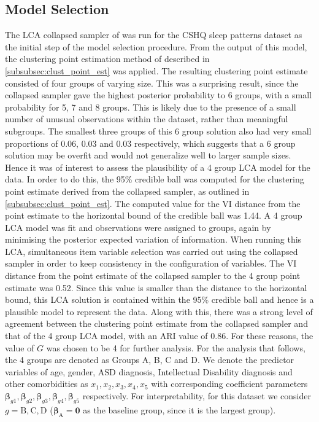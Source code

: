 \documentclass[11pt]{article}
\def\bsbet{\boldsymbol{\beta}}
\theoremstyle{plain}
\theoremstyle{definition}
\begin{document}
\subsection{Model Selection}
The LCA collapsed sampler of \citet{white_bayesian_2016} was run for the CSHQ sleep patterns dataset as the initial step of the model selection procedure. From the output of this model, the clustering point estimation method of \citet{wade_bayesian_2018} described in \ref{subsubsec:clust_point_est} was applied. The resulting clustering point estimate consisted of four groups of varying size. This was a surprising result, since the collapsed sampler gave the highest posterior probability to 6 groups, with a small probability for 5, 7 and 8 groups. This is likely due to the presence of a small number of unusual observations within the dataset, rather than meaningful subgroups. The smallest three groups of this 6 group solution also had very small proportions of 0.06, 0.03 and 0.03 respectively, which suggests that a 6 group solution may be overfit and would not generalize well to larger sample sizes. Hence it was of interest to assess the plausibility of a 4 group LCA model for the data. In order to do this, the 95\% credible ball was computed for the clustering point estimate derived from the collapsed sampler, as outlined in \ref{subsubsec:clust_point_est}. The computed value for the VI distance from the point estimate to the horizontal bound of the credible ball was 1.44. A 4 group LCA model was fit and observations were assigned to groups, again by minimising the posterior expected variation of information. When running this LCA, simultaneous item variable selection was carried out using the collapsed sampler in order to keep consistency in the configuration of variables. The VI distance from the point estimate of the collapsed sampler to the 4 group point estimate was 0.52. Since this value is smaller than the distance to the horizontal bound, this LCA solution is contained within the 95\% credible ball and hence is a plausible model to represent the data. Along with this, there was a strong level of agreement between the clustering point estimate from the collapsed sampler and that of the 4 group LCA model, with an ARI value of 0.86.  For these reasons, the value of $G$ was chosen to be 4 for further analysis. 
For the analysis that follows, the 4 groups are denoted as Groups A, B, C and D. We denote the predictor variables of age, gender, ASD diagnosis, Intellectual Disability diagnosis and other comorbidities as $x_1, x_2, x_3, x_4, x_5$ with corresponding coefficient parameters $\bsbet_{g1}, \bsbet_{g2}, \bsbet_{g3}, \bsbet_{g4}, \bsbet_{g5}$ respectively. For interpretability, for this dataset we consider $g = \text{B},\text{C},\text{D}$ ($\bsbet_{\text{A}} = \mathbf{0}$ as the baseline group, since it is the largest group).
\end{document}
